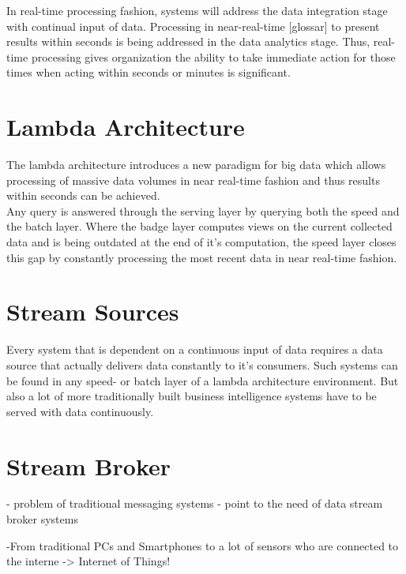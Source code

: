In real-time processing fashion, systems will address the data integration stage
with continual input of data. Processing in near-real-time [glossar] to present 
results within seconds is being addressed in the data analytics stage. Thus,
real-time processing gives organization the ability to take immediate action
for those times when acting within seconds or minutes is significant.
\cite{PrpSvyOfDSPS}



\section{Lambda Architecture}
The lambda architecture introduces a new paradigm for big data which allows
processing of massive data volumes in near real-time fashion and thus results within
seconds can be achieved. 
\\
Any query is answered through the serving layer by querying 
both the speed and the batch layer. Where the badge layer computes views on the current collected data and
is being outdated at the end of it's computation, the speed layer closes this 
gap by constantly processing the most recent data in near real-time fashion. 
\cite{marz2015big} \cite{PrpSvyOfDSPS}

\section{Stream Sources}
Every system that is dependent on a continuous input of data requires a data
source that actually delivers data constantly to it's consumers. Such systems
can be found in any speed- or batch layer of a lambda architecture environment. 
But also a lot of more traditionally built business intelligence systems have to be
served with data continuously.

\section{Stream Broker}


- problem of traditional messaging systems
- point to the need of data stream broker systems


-From traditional PCs and Smartphones to a lot of sensors who are connected to
the interne -> Internet of Things!



